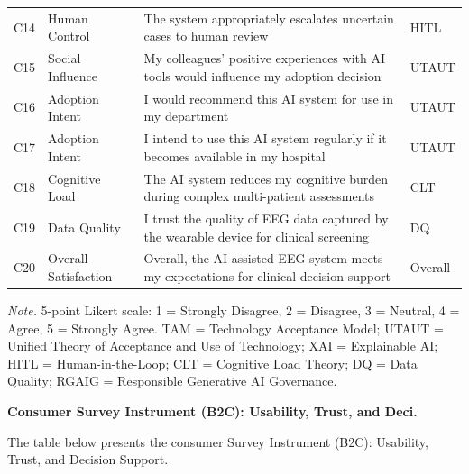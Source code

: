 \begin{table}[p]
\begin{tabularx}{\textwidth}{@{} >{\raggedright\arraybackslash}p{0.5cm} >{\raggedright\arraybackslash}p{2.2cm} L >{\raggedright\arraybackslash}p{1.5cm} @{}}
\addlinespace
C14 & Human Control & The system appropriately escalates uncertain cases to human review & HITL \\
\addlinespace
C15 & Social Influence & My colleagues' positive experiences with AI tools would influence my adoption decision & UTAUT \\
\addlinespace
C16 & Adoption Intent & I would recommend this AI system for use in my department & UTAUT \\
\addlinespace
C17 & Adoption Intent & I intend to use this AI system regularly if it becomes available in my hospital & UTAUT \\
\addlinespace
C18 & Cognitive Load & The AI system reduces my cognitive burden during complex multi-patient assessments & CLT \\
\addlinespace
C19 & Data Quality & I trust the quality of EEG data captured by the wearable device for clinical screening & DQ \\
\addlinespace
C20 & Overall Satisfaction & Overall, the AI-assisted EEG system meets my expectations for clinical decision support & Overall \\
\bottomrule
\end{tabularx}
\vspace{0.5em}
\noindent\textit{Note.} 5-point Likert scale: 1 = Strongly Disagree, 2 = Disagree, 3 = Neutral, 4 = Agree, 5 = Strongly Agree. TAM = Technology Acceptance Model; UTAUT = Unified Theory of Acceptance and Use of Technology; XAI = Explainable AI; HITL = Human-in-the-Loop; CLT = Cognitive Load Theory; DQ = Data Quality; RGAIG = Responsible Generative AI Governance.
\end{table}


\noindent\textbf{Consumer Survey Instrument (B2C): Usability, Trust, and Deci.}

\noindent The table below presents the consumer Survey Instrument (B2C): Usability, Trust, and Decision Support.

